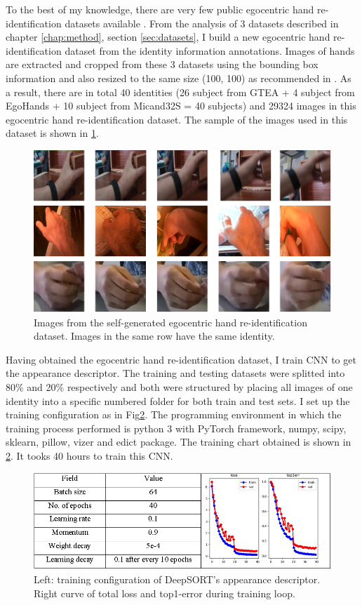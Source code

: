 To the best of my knowledge, there are very few public egocentric hand re-identification datasets available \cite{9064606}. From the analysis of 3 datasets described in chapter \ref{chap:method}, section \ref{sec:datasets}, I build a new egocentric hand re-identification dataset from the identity information annotations. Images of hands are extracted and cropped from these 3 datasets using the bounding box information and also resized to the same size (100, 100) as recommended in \cite{DBLP:journals/corr/abs-1812-00442}. As a result, there are in total 40 identities (26 subject from GTEA + 4 subject from EgoHands + 10 subject from Micand32S = 40 subjects) and 29324 images in this egocentric hand re-identification dataset. The sample of the images used in this dataset is shown in \ref{fig:reid}.
\begin{figure}[!htb]
\centerline{\includegraphics[width=1\linewidth]{Figs/reid.png}}
\caption{Images from the self-generated egocentric hand re-identification dataset. Images in the same row have the same identity.}
\label{fig:reid}
\end{figure}
Having obtained the egocentric hand re-identification dataset, I train CNN to get the appearance descriptor. The training and testing datasets were splitted into 80\% and 20\% respectively and both were structured by placing all images of one identity into a specific numbered folder for both train and test sets. I set up the training configuration as in Fig\ref{fig:descriptor}. The programming environment in which the training process performed is python 3 with PyTorch framework, numpy, scipy, sklearn, pillow, vizer and edict package.
The training chart obtained is shown in \ref{fig:descriptor}. It tooks 40 hours to train this CNN.
\begin{figure}[!htb]
\centering
\includegraphics[width=\linewidth]{Figs/training_descriptor.png}
\caption{Left: training configuration of DeepSORT’s appearance descriptor. Right curve of total loss and top1-error during training loop.}
\label{fig:descriptor}
\end{figure}
